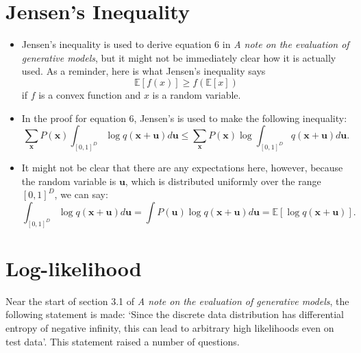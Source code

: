 \documentclass{article}
\begin{document}
\section{Jensen's Inequality}

\begin{itemize}
	\item Jensen's inequality is used to derive equation 6 in \emph{A note on the evaluation of generative models}, but it might not be immediately clear how it is actually used. As a reminder, here is what Jensen's inequality says
	\begin{equation}
	\mathbb{E}[f(x)] \ge f(\mathbb{E}[x])
	\end{equation}
	if $f$ is a convex function and $x$ is a random variable.
	
	\item In the proof for equation 6, Jensen's is used to make the following inequality:
	\begin{equation}
	\sum_\mathbf{x}P(\mathbf{x})\int_{[0,1]^D}\log q(\mathbf{x} + \mathbf{u})d\mathbf{u} \le \sum_\mathbf{x}P(\mathbf{x})\log \int_{[0,1]^D} q(\mathbf{x} + \mathbf{u})d\mathbf{u}.
	\end{equation} 
	
	\item It might not be clear that there are any expectations here, however, because the random variable is $\mathbf{u}$, which is distributed uniformly over the range $[0,1]^D$, we can say:
	\begin{equation}
	\int_{[0,1]^D}\log q(\mathbf{x} + \mathbf{u})d\mathbf{u} = \int P(\mathbf{u})\log q(\mathbf{x} + \mathbf{u})d\mathbf{u} = \mathbb{E}[\log q(\mathbf{x} + \mathbf{u})].
	\end{equation}
\end{itemize}

\section{Log-likelihood}

Near the start of section 3.1 of \emph{A note on the evaluation of generative models}, the following statement is made: `Since the discrete data distribution has differential entropy of negative infinity, this can lead to arbitrary high likelihoods even on test data'. This statement raised a number of questions.
\end{document}
